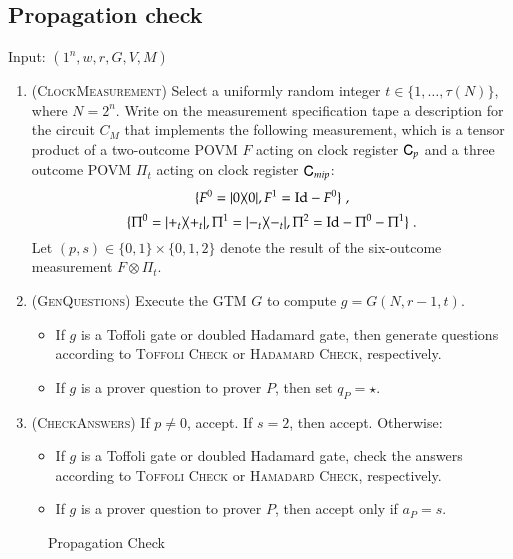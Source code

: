 \subsection{Propagation check}
\label{sec:prop_check}

\vspace{10pt}
\begin{center}
\begin{mdframed}
    Input: $(1^n,w,r,G,V,M)$
	\begin{enumerate}
		\item (\textsc{ClockMeasurement}) Select a uniformly random integer $t\in\{1,\ldots, \tau(N)\}$, where $N = 2^n$. Write on the measurement specification tape a description for the circuit $C_M$ that implements the following measurement, which is a tensor product of a two-outcome POVM $F$ acting on clock register ${\textsf{C}}_p$ and a three outcome POVM $\Pi_t$ acting on clock register ${\textsf{C}}_{mip}$: 
\[
	\{F^0 = |0\rangle\! \langle 0|, F^1 = \mathop{\mathrm{Id}}\!\mathinner{} - F^0 \}\;,
\]
\[
	\{ 	\Pi^0 = |+_t\rangle\! \langle +_t|, 
	\Pi^1 = |-_t\rangle\! \langle -_t|, 
	\Pi^2 = \mathop{\mathrm{Id}}\!\mathinner{} - \Pi^0 - \Pi^1 \}\;.
\]	
Let $(p,s) \in \{0,1\} \times \{0,1,2\}$ denote the result of the six-outcome measurement $F \otimes \Pi_t$.

	\item (\textsc{GenQuestions}) Execute the GTM $G$ to compute $g = G(N,r-1,t)$. 
	\begin{itemize}
		\item If $g$ is a Toffoli gate or doubled Hadamard gate, then generate questions according to \textsc{Toffoli Check} or \textsc{Hadamard Check}, respectively. 
		\item If $g$ is a prover question to prover $P$, then set $q_P = \star$. %
	\end{itemize}
		\item (\textsc{CheckAnswers}) If $p \neq 0$, accept. If $s = 2$, then accept. Otherwise:
		\begin{itemize}
			\item If $g$ is a Toffoli gate or doubled Hadamard gate, check the answers according to \textsc{Toffoli Check} or \textsc{Hamadard Check}, respectively. 
			\item If $g$ is a prover question to prover $P$, then accept only if $a_P = s$. 
		\end{itemize}
	\end{enumerate}    
\end{mdframed}

\end{center}
\begin{figure}[H]
\caption{Propagation Check}
\label{fig:prop_check}
\end{figure}

